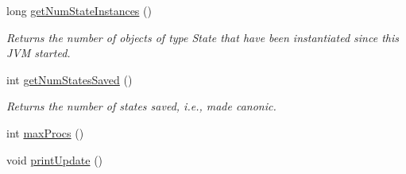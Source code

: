 \begin{DoxyCompactItemize}
\item 
long \hyperlink{classedu_1_1udel_1_1cis_1_1vsl_1_1civl_1_1kripke_1_1common_1_1CommonStateManager_a5a3699d3a56b88bc27117b430a4deced}{get\+Num\+State\+Instances} ()
\begin{DoxyCompactList}\small\item\em Returns the number of objects of type State that have been instantiated since this J\+V\+M started. \end{DoxyCompactList}\item 
int \hyperlink{classedu_1_1udel_1_1cis_1_1vsl_1_1civl_1_1kripke_1_1common_1_1CommonStateManager_af64452ff8a289a3df31e77a7218791e5}{get\+Num\+States\+Saved} ()
\begin{DoxyCompactList}\small\item\em Returns the number of states saved, i.\+e., made canonic. \end{DoxyCompactList}\item 
int \hyperlink{classedu_1_1udel_1_1cis_1_1vsl_1_1civl_1_1kripke_1_1common_1_1CommonStateManager_a06cf598360f9233da7f220ddf8f3d206}{max\+Procs} ()
\item 
\hypertarget{classedu_1_1udel_1_1cis_1_1vsl_1_1civl_1_1kripke_1_1common_1_1CommonStateManager_a9d696a173878dff32fd81f2592822c10}{}void \hyperlink{classedu_1_1udel_1_1cis_1_1vsl_1_1civl_1_1kripke_1_1common_1_1CommonStateManager_a9d696a173878dff32fd81f2592822c10}{print\+Update} ()\label{classedu_1_1udel_1_1cis_1_1vsl_1_1civl_1_1kripke_1_1common_1_1CommonStateManager_a9d696a173878dff32fd81f2592822c10}


\end{DoxyCompactItemize}
